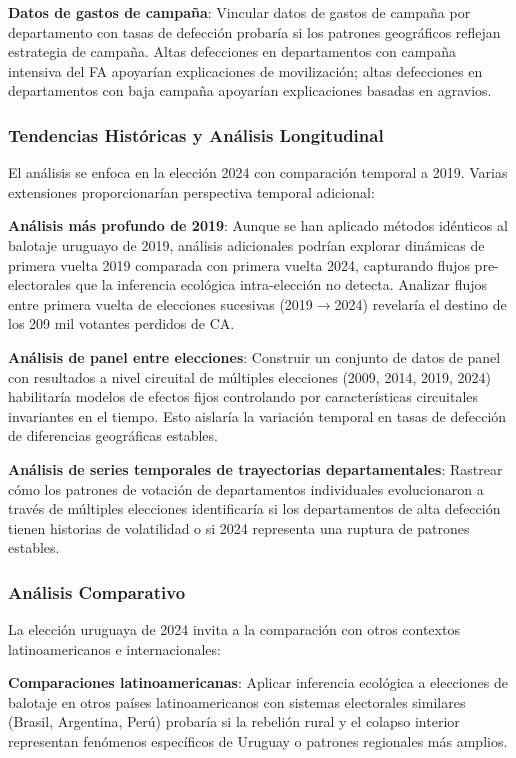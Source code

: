 \textbf{Datos de gastos de campaña}: Vincular datos de gastos de campaña por departamento con tasas de defección probaría si los patrones geográficos reflejan estrategia de campaña. Altas defecciones en departamentos con campaña intensiva del FA apoyarían explicaciones de movilización; altas defecciones en departamentos con baja campaña apoyarían explicaciones basadas en agravios.

\subsubsection{Tendencias Históricas y Análisis Longitudinal}

El análisis se enfoca en la elección 2024 con comparación temporal a 2019. Varias extensiones proporcionarían perspectiva temporal adicional:

\textbf{Análisis más profundo de 2019}: Aunque se han aplicado métodos idénticos al balotaje uruguayo de 2019, análisis adicionales podrían explorar dinámicas de primera vuelta 2019 comparada con primera vuelta 2024, capturando flujos pre-electorales que la inferencia ecológica intra-elección no detecta. Analizar flujos entre primera vuelta de elecciones sucesivas (2019$\to$2024) revelaría el destino de los 209 mil votantes perdidos de CA.

\textbf{Análisis de panel entre elecciones}: Construir un conjunto de datos de panel con resultados a nivel circuital de múltiples elecciones (2009, 2014, 2019, 2024) habilitaría modelos de efectos fijos controlando por características circuitales invariantes en el tiempo. Esto aislaría la variación temporal en tasas de defección de diferencias geográficas estables.

\textbf{Análisis de series temporales de trayectorias departamentales}: Rastrear cómo los patrones de votación de departamentos individuales evolucionaron a través de múltiples elecciones identificaría si los departamentos de alta defección tienen historias de volatilidad o si 2024 representa una ruptura de patrones estables.

\subsubsection{Análisis Comparativo}

La elección uruguaya de 2024 invita a la comparación con otros contextos latinoamericanos e internacionales:

\textbf{Comparaciones latinoamericanas}: Aplicar inferencia ecológica a elecciones de balotaje en otros países latinoamericanos con sistemas electorales similares (Brasil, Argentina, Perú) probaría si la rebelión rural y el colapso interior representan fenómenos específicos de Uruguay o patrones regionales más amplios.

